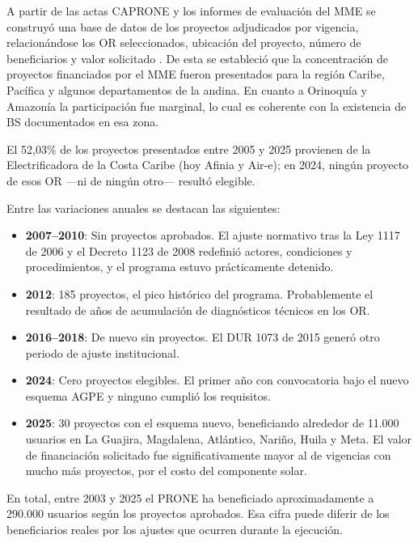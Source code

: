 A partir de las actas CAPRONE y los informes de evaluación del MME se construyó una base de datos de los proyectos adjudicados por vigencia, relacionándose los OR seleccionados, ubicación del proyecto, número de beneficiarios y valor solicitado \parencite{MME2025}. De esta se estableció que la concentración de proyectos financiados por el MME fueron presentados para la región Caribe, Pacífica y algunos departamentos de la andina. En cuanto a Orinoquía y Amazonía la participación fue marginal, lo cual es coherente con la existencia de BS documentados en esa zona.

El 52,03\% de los proyectos presentados entre 2005 y 2025 provienen de la Electrificadora de la Costa Caribe (hoy Afinia y Air-e); en 2024, ningún proyecto de esos OR —ni de ningún otro— resultó elegible.

Entre las variaciones anuales se destacan las siguientes:

\begin{itemize}
    \item \textbf{2007--2010}: Sin proyectos aprobados. El ajuste normativo tras la Ley 1117 de 2006 y el Decreto 1123 de 2008 redefinió actores, condiciones y procedimientos, y el programa estuvo prácticamente detenido.

    \item \textbf{2012}: 185 proyectos, el pico histórico del programa. Probablemente el resultado de años de acumulación de diagnósticos técnicos en los OR.

    \item \textbf{2016--2018}: De nuevo sin proyectos. El DUR 1073 de 2015 generó otro periodo de ajuste institucional.

    \item \textbf{2024}: Cero proyectos elegibles. El primer año con convocatoria bajo el nuevo esquema AGPE y ninguno cumplió los requisitos.

    \item \textbf{2025}: 30 proyectos con el esquema nuevo, beneficiando alrededor de 11.000 usuarios en La Guajira, Magdalena, Atlántico, Nariño, Huila y Meta. El valor de financiación solicitado fue significativamente mayor al de vigencias con mucho más proyectos, por el costo del componente solar.
\end{itemize}

En total, entre 2003 y 2025 el PRONE ha beneficiado aproximadamente a 290.000 usuarios según los proyectos aprobados. Esa cifra puede diferir de los beneficiarios reales por los ajustes que ocurren durante la ejecución.

